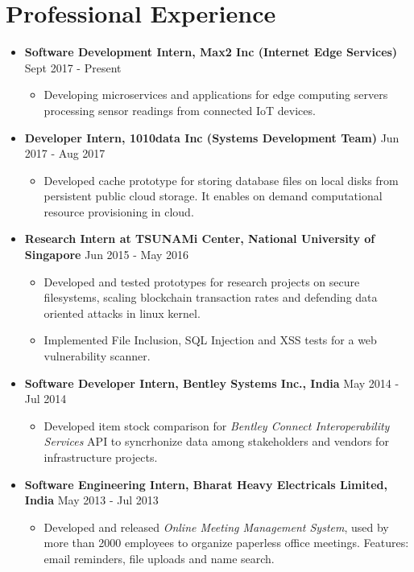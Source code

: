 \documentclass{article}
\newcommand{\bi}{\vspace{-1mm}\begin{itemize}[align=left,leftmargin=*, rightmargin=80pt, labelindent=0pt,labelsep=2pt, label={-}, nosep]}
\newcommand{\ei}{\end{itemize}}
\begin{document}
\section*{Professional Experience}
\begin{itemize}

    \item \textbf{Software Development Intern, Max2 Inc (Internet Edge Services)} {\hfill Sept 2017 - Present}
    \bi
        \item Developing microservices and applications for edge computing servers processing sensor readings from connected IoT devices.
    \ei

    \item \textbf{Developer Intern, 1010data Inc (Systems Development Team)} {\hfill Jun 2017 - Aug 2017}
    \bi
        \item Developed cache prototype for storing database files on local disks from persistent public cloud storage. It enables on demand computational resource provisioning in cloud.
    \ei

    \item \textbf{Research Intern at TSUNAMi Center, National University of Singapore} {\hfill Jun 2015 - May 2016}
    \bi
        \item Developed and tested prototypes for research projects on secure filesystems, scaling blockchain transaction rates and defending data oriented attacks in linux kernel.

        \item Implemented File Inclusion, SQL Injection and XSS tests for a web vulnerability scanner.
    \ei
    
    \item \textbf{Software Developer Intern, Bentley Systems Inc., India} {\hfill May 2014 - Jul 2014}
    \bi
        \item Developed item stock comparison for \textit{Bentley Connect Interoperability Services} API to syncrhonize data among stakeholders and vendors for infrastructure projects.
    \ei

    \item \textbf{Software Engineering Intern, Bharat Heavy Electricals Limited, India} {\hfill May 2013 - Jul 2013}
    \bi
        \item Developed and released \textit{Online Meeting Management System}, used by more than 2000 employees to organize paperless office meetings. Features: email reminders, file uploads and name search.
    \ei 
\end{itemize}
\end{document}
